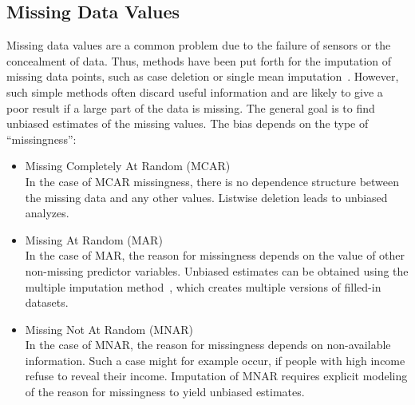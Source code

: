 \documentclass[a4paper,11pt]{article}
\begin{document}
\subsection{Missing Data Values}

Missing data values are a common problem due to the failure of sensors
or the concealment of data. Thus, methods have been put forth for the
imputation of missing data points, such as case deletion or single
mean imputation~\cite{schafer2002missing}. However, such simple
methods often discard useful information and are likely to give a poor
result if a large part of the data is missing. The general goal is to
find unbiased estimates of the missing values. The bias depends on the
type of ``missingness'':

\begin{itemize}
\item Missing Completely At Random (MCAR)\\
  In the case of MCAR missingness, there is no dependence structure
  between the missing data and any other values. Listwise deletion
  leads to unbiased analyzes.
\item Missing At Random (MAR)\\
  In the case of MAR, the reason for missingness depends on the value
  of other non-missing predictor variables. Unbiased estimates can be
  obtained using the multiple imputation method~\cite{de2013multiple},
  which creates multiple versions of filled-in datasets.
\item Missing Not At Random (MNAR)\\
  In the case of MNAR, the reason for missingness depends on
  non-available information. Such a case might for example occur, if
  people with high income refuse to reveal their income. Imputation of
  MNAR requires explicit modeling of the reason for missingness to
  yield unbiased estimates.
\end{itemize}
\end{document}
